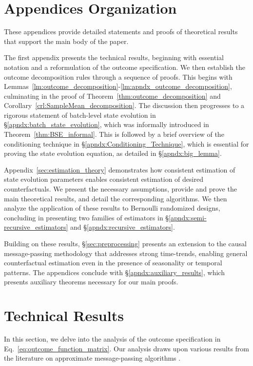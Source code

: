 \section*{Appendices Organization}
\label{appendices}
% 
These appendices provide detailed statements and proofs of theoretical results that support the main body of the paper.

The first appendix presents the technical results, beginning with essential notation and a reformulation of the outcome specification. We then establish the outcome decomposition rules through a sequence of proofs. This begins with Lemmas~\ref{lm:outcome_decomposition}-\ref{lm:apndx_outcome_decomposition}, culminating in the proof of Theorem~\ref{thm:outcome_decomposition} and Corollary~\ref{crl:SampleMean_decomposition}. The discussion then progresses to a rigorous statement of batch-level state evolution in \S\ref{apndx:batch_state_evolution}, which was informally introduced in Theorem~\ref{thm:BSE_informal}. This is followed by a brief overview of the conditioning technique in \S\ref{apndx:Conditioning_Technique}, which is essential for proving the state evolution equation, as detailed in \S\ref{apndx:big_lemma}.

Appendix~\ref{sec:estimation_theory} demonstrates how consistent estimation of state evolution parameters enables consistent estimation of desired counterfactuals. We present the necessary assumptions, provide and prove the main theoretical results, and detail the corresponding algorithms. We then analyze the application of these results to Bernoulli randomized designs, concluding in presenting two families of estimators in \S\ref{apndx:semi-recursive_estimators} and \S\ref{apndx:recursive_estimators}.

Building on these results, \S\ref{sec:preprocessing} presents an extension to the causal message-passing methodology that addresses strong time-trends, enabling general counterfactual estimation even in the presence of seasonality or temporal patterns. The appendices conclude with \S\ref{apndx:auxiliary_results}, which presents auxiliary theorems necessary for our main proofs.


\section{Technical Results}
\label{sec:Technical_Results}
% 
In this section, we delve into the analysis of the outcome specification in Eq.~\eqref{eq:outcome_function_matrix}. Our analysis draws upon various results from the literature on approximate message-passing algorithms \citep{donoho2009message,bayati2011dynamics, rush2018finite,li2022non}.

